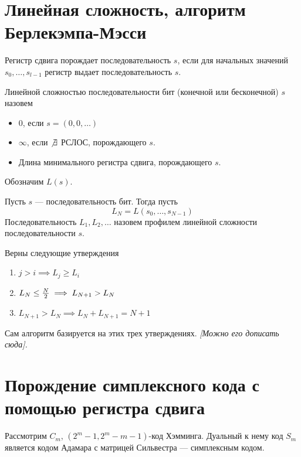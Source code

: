 \section{Линейная сложность, алгоритм Берлекэмпа-Мэсси}
\begin{definition}
Регистр сдвига порождает последовательность $s$, если для начальных
значений $s_0, \ldots, s_{l-1}$ регистр выдает последовательность $s$.
\end{definition}

\begin{definition}
Линейной сложностью последовательности бит (конечной или 
бесконечной) $s$ назовем
\begin{itemize}
\item $0$, если $s = (0, 0, \ldots)$
\item $\infty$, если $\not\exists$ РСЛОС, порождающего $s$.
\item Длина минимального регистра сдвига, порождающего $s$.
\end{itemize}

Обозначим $L(s)$.
\end{definition}

\begin{definition}
Пусть $s$ --- последовательность бит. Тогда пусть $$L_N = L(s_0, \ldots, s_{N-1})$$
Последовательность $L_1, L_2, \ldots$ назовем профилем линейной сложности
последовательности $s$.
\end{definition}


\begin{proposition}
Верны следующие утверждения
\begin{enumerate}
\item $j > i \implies L_j \ge L_i$
\item $L_N \le {N \over 2} \implies L_{N+1} > L_N$
\item $L_{N+1} > L_N \implies L_{N} + L_{N+1} = N+1$
\end{enumerate}
\end{proposition}

Сам алгоритм базируется на этих трех утверждениях. \emph{[Можно его дописать
сюда].}

\section{Порождение симплексного кода с помощью регистра сдвига}

\begin{definition}
Рассмотрим $C_m$, $(2^m - 1, 2^m - m - 1)$-код Хэмминга. Дуальный к нему код
$S_m$ является кодом Адамара с матрицей Сильвестра --- симплексным кодом.
\end{definition}

